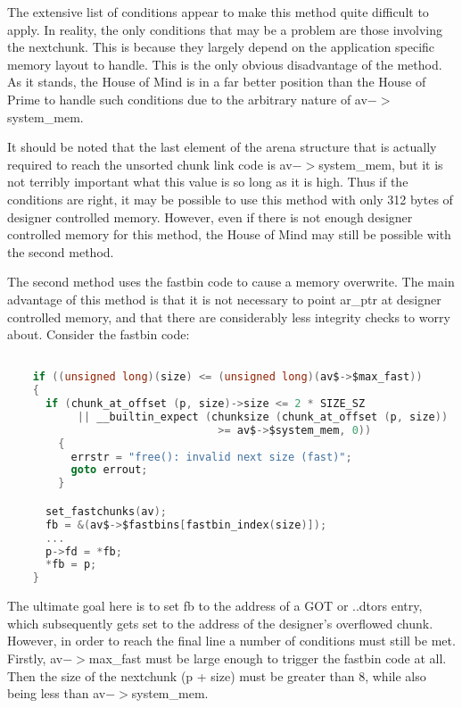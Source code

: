 \documentclass[12pt]{article}
\begin{document}
The extensive list of conditions appear to make this method quite
difficult to apply. In reality, the only conditions that may be a
problem are those involving the nextchunk. This is because they
largely depend on the application specific memory layout to handle.
This is the only obvious disadvantage of the method. As it stands,
the House of Mind is in a far better position than the House of
Prime to handle such conditions due to the arbitrary nature of av$->$system\_mem.
\newline


It should be noted that the last element of the arena structure
that is actually required to reach the unsorted chunk link code is
av$->$system\_mem, but it is not terribly important what this value is
so long as it is high. Thus if the conditions are right, it may be
possible to use this method with only 312 bytes of designer
controlled memory. However, even if there is not enough designer
controlled memory for this method, the House of Mind may still be
possible with the second method.
\newline


The second method uses the fastbin code to cause a memory
overwrite. The main advantage of this method is that it is not
necessary to point ar\_ptr at designer controlled memory, and that
there are considerably less integrity checks to worry about.
Consider the fastbin code:

\begin{lstlisting}[language=C]

    if ((unsigned long)(size) <= (unsigned long)(av$->$max_fast))
    {
      if (chunk_at_offset (p, size)->size <= 2 * SIZE_SZ
           || __builtin_expect (chunksize (chunk_at_offset (p, size))
                                 >= av$->$system_mem, 0))
        {
          errstr = "free(): invalid next size (fast)";
          goto errout;
        }

      set_fastchunks(av);
      fb = &(av$->$fastbins[fastbin_index(size)]);
      ...
      p->fd = *fb;
      *fb = p;
    }
\end{lstlisting}

The ultimate goal here is to set fb to the address of a GOT or
..dtors entry, which subsequently gets set to the address of the
designer's overflowed chunk. However, in order to reach the final
line a number of conditions must still be met. Firstly, av$->$max\_fast must be large enough to trigger the fastbin code at all.
Then the size of the nextchunk (p + size) must be greater than 8,
while also being less than av$->$system\_mem.
\newline
\end{document}
